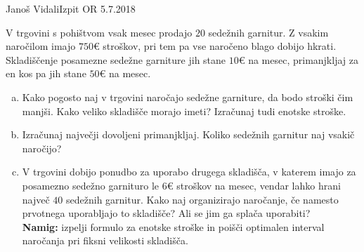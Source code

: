 \begin{naloga}{Janoš Vidali}{Izpit OR 5.7.2018}
\begin{vprasanje}
V trgovini s pohištvom vsak mesec prodajo $20$ sedežnih garnitur.
Z vsakim naročilom imajo $750 €$ stroškov,
pri tem pa vse naročeno blago dobijo hkrati.
Skladiščenje posamezne sedežne garniture jih stane $10 €$ na mesec,
primanjkljaj za en kos pa jih stane $50 €$ na mesec.

\begin{enumerate}[(a)]
\item Kako pogosto naj v trgovini naročajo sedežne garniture,
da bodo stroški čim manjši.
Kako veliko skladišče morajo imeti?
Izračunaj tudi enotske stroške.

\item Izračunaj največji dovoljeni primanjkljaj.
Koliko sedežnih garnitur naj vsakič naročijo?

\item V trgovini dobijo ponudbo za uporabo drugega skladišča,
v katerem imajo za po\-sa\-mez\-no se\-dež\-no garnituro
le $6 €$ stroškov na mesec,
vendar lahko hrani največ $40$ sedežnih garnitur.
Kako naj organizirajo naročanje,
če namesto prvotnega uporabljajo to skladišče?
Ali se jim ga splača uporabiti? \\
{\small {\bf Namig:} izpelji formulo za enotske stroške
in poišči optimalen interval naročanja pri fiksni velikosti skladišča.}
\end{enumerate}
\end{vprasanje}
\begin{odgovor}
\end{odgovor}
\end{naloga}
